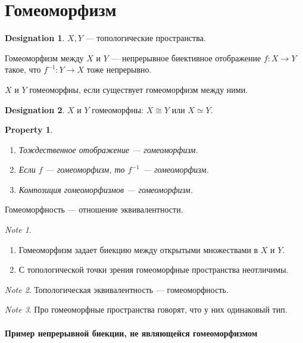 \documentclass[11pt]{book}
\theoremstyle{definition}
\theoremstyle{plain}
\theoremstyle{plain}
\newtheorem*{prop}{Property}
\theoremstyle{definition}
\newtheorem*{name}{Designation}
\theoremstyle{remark}
\newtheorem*{note}{Note}
\begin{document}
\section{Гомеоморфизм}
\begin{name}
    $ X, Y$ --- топологические пространства.
\end{name}
\begin{defn}
    Гомеоморфизм между  $ X$ и $ Y$  --- непрерывное биективное отображение $ f: X \to  Y$ такое, что $ f^{-1} : Y \to  X$ тоже непрерывно.
\end{defn}
\begin{defn}
    $ X$ и $ Y$ гомеоморфны, если существует гомеоморфизм между ними.
\end{defn}
\begin{name}
    $ X$ и $ Y$ гомеоморфны: $ X \cong Y$ или $ X \simeq Y$.
\end{name}
\begin{prop}
    $ $
    \begin{enumerate}[noitemsep]
	\item Тождественное отображение --- гомеоморфизм.
	\item Если $ f$ --- гомеоморфизм, то $ f^{-1}$ --- гомеоморфизм.
	\item Композиция  гомеоморфизмов --- гомеоморфизм.
    \end{enumerate}
\end{prop}
\begin{thm}
    Гомеоморфность --- отношение эквивалентности.
\end{thm}
\begin{note}
    $ $
    \begin{enumerate}[noitemsep]
	\item Гомеоморфизм задает биекцию между открытыми множествами в $ X$ и $ Y$.
	\item С топологической точки зрения гомеоморфные пространства неотличимы.
    \end{enumerate}
\end{note}
\begin{note}
    Топологическая эквивалентность --- гомеоморфность.
\end{note}
\begin{note}
    Про гомеоморфные пространства говорят, что у них одинаковый тип.
\end{note}
\paragraph{Пример непрерывной биекции, не являющейся гомеоморфизмом}
$ $
\end{document}
